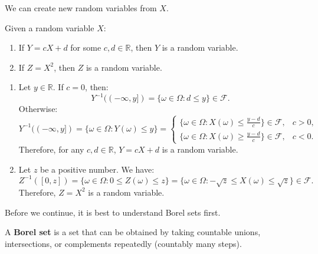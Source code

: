 \documentclass{huhtakm-template-book-v2}
\begin{document}
    We can create new random variables from $X$.
    \begin{lem}
        Given a random variable $X$:
        \begin{enumerate}
            \item If $Y = cX+d$ for some $c,d \in \mathbb{R}$, then $Y$ is a random variable.
            \item If $Z = X^{2}$, then $Z$ is a random variable.
        \end{enumerate}
    \end{lem} 
    \begin{proofing}
        \begin{enumerate}
            \item Let $y \in \mathbb{R}$. If $c = 0$, then:
            \begin{equation*}
                Y^{-1}((-\infty,y]) = \{\omega \in \Omega:d \leq y\} \in \mathcal{F}.
            \end{equation*}
            Otherwise:
            \begin{equation*}
                Y^{-1}((-\infty,y]) = \{\omega \in \Omega:Y(\omega) \leq y\} = \begin{cases}
                    \bigg\{\omega \in \Omega:X(\omega) \leq \frac{y-d}{c}\bigg\} \in \mathcal{F}, &c > 0,\\
                    \bigg\{\omega \in \Omega:X(\omega) \geq \frac{y-d}{c}\bigg\} \in \mathcal{F}, &c < 0.
                \end{cases}
            \end{equation*}
            Therefore, for any $c,d \in \mathbb{R}$, $Y = cX+d$ is a random variable.
            \item Let $z$ be a positive number. We have:
            \begin{equation*}
                Z^{-1}([0,z]) = \{\omega \in \Omega:0 \leq Z(\omega) \leq z\} = \{\omega \in \Omega:-\sqrt{z} \leq X(\omega) \leq \sqrt{z}\} \in \mathcal{F}.
            \end{equation*}
            Therefore, $Z = X^{2}$ is a random variable.
        \end{enumerate}
    \end{proofing}
    Before we continue, it is best to understand Borel sets first.
    \begin{defn}
        A \textbf{Borel set} is a set that can be obtained by taking countable unions, intersections, or complements repeatedly (countably many steps).
    \end{defn}
\end{document}
